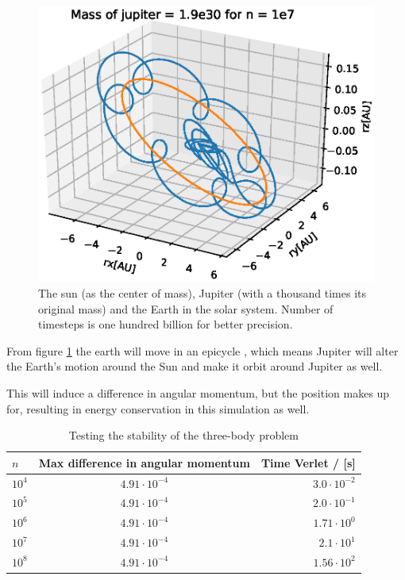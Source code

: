 \documentclass{article}
\begin{document}
\begin{figure}[H]
  \includegraphics[scale=0.6]{plots/Mass1000.eps}
  \caption{The sun (as the center of mass), Jupiter (with a thousand times its original mass) and the Earth in the solar system. Number of timesteps is one hundred billion for better precision.}
  \label{jupitermass1000}
\end{figure}

From figure \ref{jupitermass1000} the earth will move in an epicycle \cite{epicycle}, which means Jupiter will alter the Earth's motion around the Sun and make it orbit around Jupiter as well.

This will induce a difference in angular momentum, but the position makes up for, resulting in energy conservation in this simulation as well.


\begin{table}[H]
    \centering
    \begin{tabular}{|l|c|r|}
    \hline
     $n$ & Max difference in angular momentum  & Time Verlet / [s] \\
     \hline
      $10^4$  & $4.91\cdot10^{-4}$  & $3.0\cdot10^{-2}$\\
      $10^5$  & $4.91\cdot10^{-4}$  & $2.0\cdot10^{-1}$ \\
      $10^6$  & $4.91\cdot10^{-4}$  & $1.71\cdot10^{0}$\\
      $10^7$  & $4.91\cdot10^{-4}$  & $2.1\cdot10^{1}$\\
      $10^8$  & $4.91\cdot10^{-4}$  & $1.56\cdot10^{2}$\\
      \hline
    \end{tabular}
    \caption{Testing the stability of the three-body problem}
    \label{Three-body-problem}
\end{table}
\end{document}
